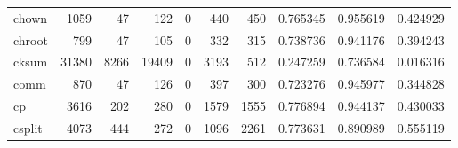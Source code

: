 \begin{tabular}{lrrrrrrrrr}
chown     &                                               1059 &                                                 47 &                                                122 &                                                  0 &                                                440 &                                                450 &                                           0.765345 &                               0.955619 &                             0.424929 \\
chroot    &                                                799 &                                                 47 &                                                105 &                                                  0 &                                                332 &                                                315 &                                           0.738736 &                               0.941176 &                             0.394243 \\
cksum     &                                              31380 &                                               8266 &                                              19409 &                                                  0 &                                               3193 &                                                512 &                                           0.247259 &                               0.736584 &                             0.016316 \\
comm      &                                                870 &                                                 47 &                                                126 &                                                  0 &                                                397 &                                                300 &                                           0.723276 &                               0.945977 &                             0.344828 \\
cp        &                                               3616 &                                                202 &                                                280 &                                                  0 &                                               1579 &                                               1555 &                                           0.776894 &                               0.944137 &                             0.430033 \\
csplit    &                                               4073 &                                                444 &                                                272 &                                                  0 &                                               1096 &                                               2261 &                                           0.773631 &                               0.890989 &                             0.555119 \\

\end{tabular}
